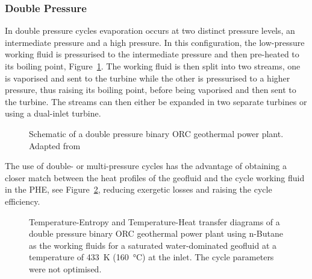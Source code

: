         
        \subsubsection{Double Pressure}
            In double pressure cycles evaporation occurs at two distinct pressure levels, an intermediate pressure and a high pressure. In this configuration, the low-pressure working fluid is pressurised to the intermediate pressure and then pre-heated to its boiling point, Figure~\ref{fig:litrev_ORC_dualP_schematic}. The working fluid is then split into two streams, one is vaporised and sent to the turbine while the other is pressurised to a higher pressure, thus raising its boiling point, before being vaporised and then sent to the turbine. The streams can then either be expanded in two separate turbines or using a dual-inlet turbine.
        
             \begin{figure}[H]
                \centering
                
                \caption[Schematic of a double pressure binary ORC geothermal power plant.]{Schematic of a double pressure binary ORC geothermal power plant. Adapted from \cite{DiPippo2016}}
                \label{fig:litrev_ORC_dualP_schematic}
            \end{figure}
    
            The use of double- or multi-pressure cycles has the advantage of obtaining a closer match between the heat profiles of the geofluid and the cycle working fluid in the \ac{PHE}, see Figure~\ref{fig:litrev_ORC_dualP_TS}, reducing exergetic losses and raising the cycle efficiency.         

             \begin{figure}[H]
                \centering
                
                \caption[TS and TQ diagram of a double pressure binary \ac{ORC} geothermal plant using n-Butane as the working fluid.]{Temperature-Entropy and Temperature-Heat transfer diagrams of a double pressure binary \ac{ORC} geothermal power plant using n-Butane as the working fluids for a saturated water-dominated geofluid at a temperature of \qty{433}{\K} (\qty{160}{\degreeCelsius}) at the inlet. The cycle parameters were not optimised.}
                \label{fig:litrev_ORC_dualP_TS}
            \end{figure}
    
